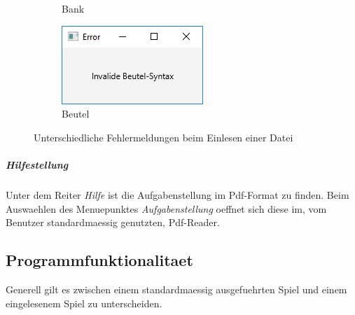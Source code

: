 \begin{figure}
\begin{subfigure}[b]{0.35\textwidth}
            \caption[]%
            {{\small Bank}}    
            \label{fig:BankErr}
        \end{subfigure}
        \quad
        \begin{subfigure}[b]{0.35\textwidth}   
            \centering 
            \includegraphics[width=\textwidth]{screenshots/screenshot_ErrorBeutel}
            \caption[]%
            {{\small Beutel}}    
            \label{fig:BeutelErr}
        \end{subfigure}
        \caption
        {\small Unterschiedliche Fehlermeldungen beim Einlesen einer Datei} 
        \label{fig:Fehleruebersicht}
    \end{figure}

\subparagraph{Hilfestellung}
Unter dem Reiter \emph{Hilfe} ist die Aufgabenstellung im Pdf-Format zu finden. Beim Auswaehlen des Menuepunktes \emph{Aufgabenstellung} oeffnet sich diese im, vom Benutzer standardmaessig genutzten, Pdf-Reader. 

\clearpage
\subsection{Programmfunktionalitaet}
Generell gilt es zwischen einem standardmaessig ausgefuehrten Spiel und einem eingelesenem Spiel zu unterscheiden. 

